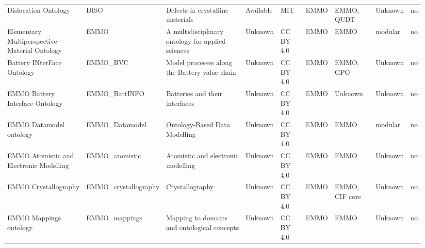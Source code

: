\begin{tabular}{m{5cm}m{2cm}m{5cm}m{2cm}m{2cm}m{2cm}m{2cm}m{2cm}m{2cm}}
                                        Dislocation Ontology \cite{diso_ontology} &                    DISO &                                                  Defects in crystalline materials &            Available &         MIT  &                         EMMO &        EMMO, QUDT &    Unknown &               no \\
                        Elementary Multiperspective Material Ontology \cite{emmo} &                    EMMO &                                 A multidisciplinary ontology for applied sciences &              Unknown &    CC BY 4.0 &                         EMMO &              EMMO &    modular &               no \\
                                                       Battery INterFace Ontology &                EMMO_BVC &                                     Model processes along the Battery value chain &              Unknown &    CC BY 4.0 &                         EMMO &         EMMO, GPO &    Unknown &               no \\
                                                  EMMO Battery Interface Ontology &           EMMO_BattINFO &                                                    Batteries and their interfaces &              Unknown &    CC BY 4.0 &                         EMMO &           Unknown &    Unknown &               no \\
                                    EMMO Datamodel ontology \cite{emmo_datamodel} &          EMMO_Datamodel &                                                     Ontology-Based Data Modelling &              Unknown &    CC BY 4.0 &                         EMMO &              EMMO &    modular &               no \\
                                          EMMO Atomistic and Electronic Modelling &          EMMO_atomistic &                                                Atomistic and electronic modelling &              Unknown &    CC BY 4.0 &                         EMMO &              EMMO &    Unknown &               no \\
                                                             EMMO Crystallography &    EMMO_crystallography &                                                                   Crystallography &              Unknown &    CC BY 4.0 &                         EMMO &   EMMO, CIF core  &    Unknown &               no \\
                                                           EMMO Mappings ontology &           EMMO_mappings &                                       Mapping to domains and ontological concepts &              Unknown &    CC BY 4.0 &                         EMMO &              EMMO &    Unknown &               no \\

\end{tabular}
